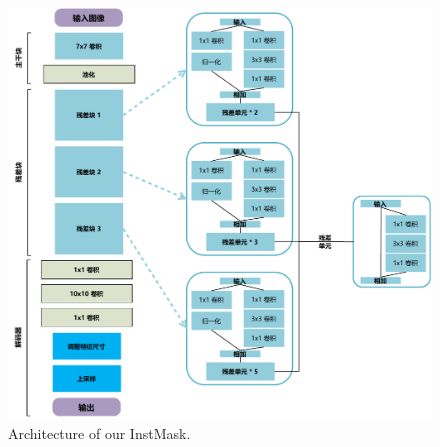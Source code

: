 \begin{figure}
    \centering
    \includegraphics[width=1.0\textwidth]{Img/IGCF/net.pdf}
    \caption{Architecture of our InstMask.}
    \label{fig:net}
\end{figure}

